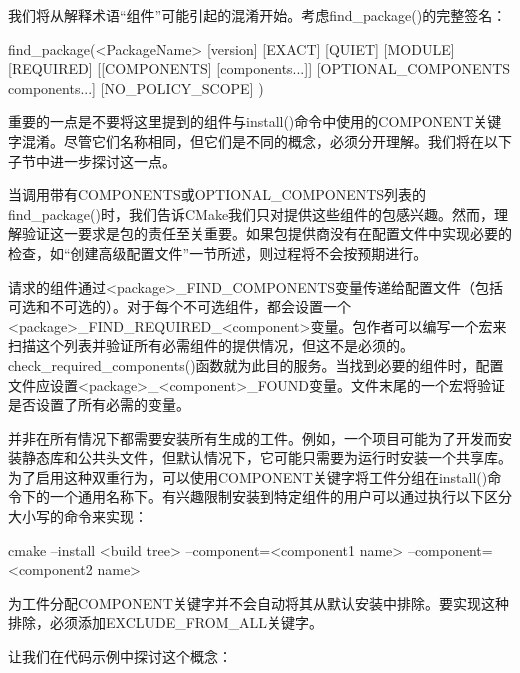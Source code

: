 
我们将从解释术语“组件”可能引起的混淆开始。考虑find\_package()的完整签名：

\begin{shell}
find_package(<PackageName>
            [version] [EXACT] [QUIET] [MODULE] [REQUIRED]
            [[COMPONENTS] [components...]]
            [OPTIONAL_COMPONENTS components...]
            [NO_POLICY_SCOPE]
)
\end{shell}

重要的一点是不要将这里提到的组件与install()命令中使用的COMPONENT关键字混淆。尽管它们名称相同，但它们是不同的概念，必须分开理解。我们将在以下子节中进一步探讨这一点。


当调用带有COMPONENTS或OPTIONAL\_COMPONENTS列表的find\_package()时，我们告诉CMake我们只对提供这些组件的包感兴趣。然而，理解验证这一要求是包的责任至关重要。如果包提供商没有在配置文件中实现必要的检查，如“创建高级配置文件”一节所述，则过程将不会按预期进行。

请求的组件通过<package>\_FIND\_COMPONENTS变量传递给配置文件（包括可选和不可选的）。对于每个不可选组件，都会设置一个<package>\_FIND\_REQUIRED\_<component>变量。包作者可以编写一个宏来扫描这个列表并验证所有必需组件的提供情况，但这不是必须的。check\_required\_components()函数就为此目的服务。当找到必要的组件时，配置文件应设置<package>\_<component>\_FOUND变量。文件末尾的一个宏将验证是否设置了所有必需的变量。


并非在所有情况下都需要安装所有生成的工件。例如，一个项目可能为了开发而安装静态库和公共头文件，但默认情况下，它可能只需要为运行时安装一个共享库。为了启用这种双重行为，可以使用COMPONENT关键字将工件分组在install()命令下的一个通用名称下。有兴趣限制安装到特定组件的用户可以通过执行以下区分大小写的命令来实现：

\begin{shell}
cmake --install <build tree>
      --component=<component1 name> --component=<component2 name>
\end{shell}

为工件分配COMPONENT关键字并不会自动将其从默认安装中排除。要实现这种排除，必须添加EXCLUDE\_FROM\_ALL关键字。

让我们在代码示例中探讨这个概念：



